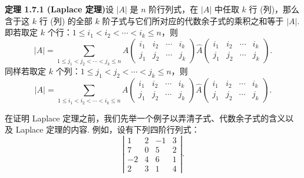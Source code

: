 \documentclass[UTF8,12pt,a4paper,fontset=fandol]{ctexart}
\begin{document}
\noindent\textbf{定理 1.7.1 (Laplace 定理)}\quad 设 $|A|$ 是 $n$ 阶行列式，在 $|A|$ 中任取 $k$ 行 (列)，那么含于这 $k$ 行 (列) 的全部 $k$ 阶子式与它们所对应的代数余子式的乘积之和等于 $|A|$. 即若取定 $k$ 个行：$1\le i_1<i_2<\cdots<i_k\le n$，则
\begin{equation}
|A|=
\sum_{1\le j_1<j_2<\cdots<j_k\le n}
A\left(\begin{array}{cccc}
i_1 & i_2 & \cdots & i_k\\
j_1 & j_2 & \cdots & j_k
\end{array}\right)
\widehat{A}\left(\begin{array}{cccc}
i_1 & i_2 & \cdots & i_k\\
j_1 & j_2 & \cdots & j_k
\end{array}\right).
\tag{1.7.4}
\end{equation}
同样若取定 $k$ 个列：$1\le j_1<j_2<\cdots<j_k\le n$，则
\begin{equation}
|A|=
\sum_{1\le i_1<i_2<\cdots<i_k\le n}
A\left(\begin{array}{cccc}
i_1 & i_2 & \cdots & i_k\\
j_1 & j_2 & \cdots & j_k
\end{array}\right)
\widehat{A}\left(\begin{array}{cccc}
i_1 & i_2 & \cdots & i_k\\
j_1 & j_2 & \cdots & j_k
\end{array}\right).
\tag{1.7.5}
\end{equation}

在证明 Laplace 定理之前，我们先举一个例子以弄清子式、代数余子式的含义以及 Laplace 定理的内容. 例如，设有下列四阶行列式：
\[
\left|\begin{array}{rrrr}
1 & 2 & -1 & 3\\
7 & 0 & 5 & 2\\
-2 & 4 & 6 & 1\\
2 & 3 & 1 & 4
\end{array}\right|.
\]
\end{document}
